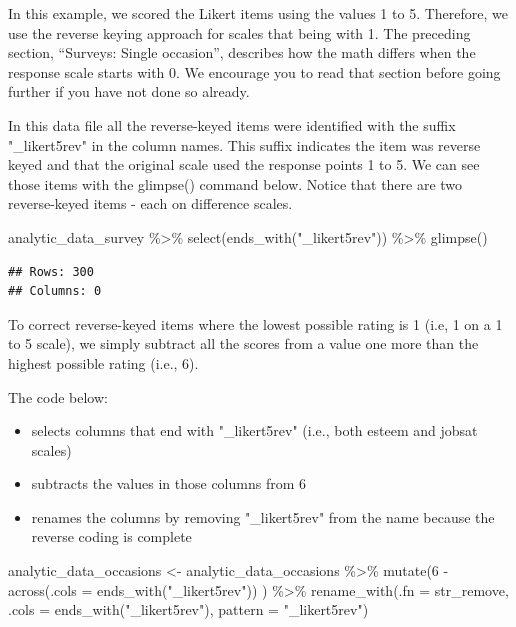 \documentclass[
]{krantz}
\makeatletter
\newenvironment{Shaded}{\begin{snugshade}}{\end{snugshade}}
\newcommand{\AttributeTok}[1]{\textcolor[rgb]{0.61,0.61,0.61}{#1}}
\newcommand{\DecValTok}[1]{\textcolor[rgb]{0.06,0.06,0.06}{#1}}
\newcommand{\FunctionTok}[1]{\textcolor[rgb]{0,0,0}{#1}}
\newcommand{\NormalTok}[1]{#1}
\newcommand{\OtherTok}[1]{\textcolor[rgb]{0.37,0.37,0.37}{#1}}
\newcommand{\SpecialCharTok}[1]{\textcolor[rgb]{0,0,0}{#1}}
\newcommand{\StringTok}[1]{\textcolor[rgb]{0.5,0.5,0.5}{#1}}
\providecommand{\tightlist}{%
  \setlength{\itemsep}{0pt}\setlength{\parskip}{0pt}}
\newenvironment{kframe}{%
\medskip{}
\setlength{\fboxsep}{.8em}
 \def\at@end@of@kframe{}%
 \ifinner\ifhmode%
  \def\at@end@of@kframe{\end{minipage}}%
  \begin{minipage}{\columnwidth}%
 \fi\fi%
 \def\FrameCommand##1{\hskip\@totalleftmargin \hskip-\fboxsep
 \colorbox{shadecolor}{##1}\hskip-\fboxsep
     \hskip-\linewidth \hskip-\@totalleftmargin \hskip\columnwidth}%
 \MakeFramed {\advance\hsize-\width
   \@totalleftmargin\z@ \linewidth\hsize
   \@setminipage}}%
 {\par\unskip\endMakeFramed%
 \at@end@of@kframe}
\renewenvironment{Shaded}{\begin{kframe}}{\end{kframe}}
\makeatother
\begin{document}
In this example, we scored the Likert items using the values 1 to 5. Therefore, we use the reverse keying approach for scales that being with 1. The preceding section, ``Surveys: Single occasion'', describes how the math differs when the response scale starts with 0. We encourage you to read that section before going further if you have not done so already.

In this data file all the reverse-keyed items were identified with the suffix "\_likert5rev" in the column names. This suffix indicates the item was reverse keyed and that the original scale used the response points 1 to 5. We can see those items with the glimpse() command below. Notice that there are two reverse-keyed items - each on difference scales.

\begin{Shaded}
\begin{Highlighting}[]
\NormalTok{analytic\_data\_survey }\SpecialCharTok{\%\textgreater{}\%}
  \FunctionTok{select}\NormalTok{(}\FunctionTok{ends\_with}\NormalTok{(}\StringTok{"\_likert5rev"}\NormalTok{)) }\SpecialCharTok{\%\textgreater{}\%}
  \FunctionTok{glimpse}\NormalTok{()}
\end{Highlighting}
\end{Shaded}

\begin{verbatim}
## Rows: 300
## Columns: 0
\end{verbatim}

To correct reverse-keyed items where the lowest possible rating is 1 (i.e, 1 on a 1 to 5 scale), we simply subtract all the scores from a value one more than the highest possible rating (i.e., 6).

The code below:

\begin{itemize}
\tightlist
\item
  selects columns that end with "\_likert5rev" (i.e., both esteem and jobsat scales)
\item
  subtracts the values in those columns from 6
\item
  renames the columns by removing "\_likert5rev" from the name because the reverse coding is complete
\end{itemize}

\begin{Shaded}
\begin{Highlighting}[]
\NormalTok{analytic\_data\_occasions }\OtherTok{\textless{}{-}}\NormalTok{ analytic\_data\_occasions }\SpecialCharTok{\%\textgreater{}\%} 
  \FunctionTok{mutate}\NormalTok{(}\DecValTok{6} \SpecialCharTok{{-}} \FunctionTok{across}\NormalTok{(}\AttributeTok{.cols =} \FunctionTok{ends\_with}\NormalTok{(}\StringTok{"\_likert5rev"}\NormalTok{)) ) }\SpecialCharTok{\%\textgreater{}\%} 
  \FunctionTok{rename\_with}\NormalTok{(}\AttributeTok{.fn =}\NormalTok{ str\_remove,}
              \AttributeTok{.cols =} \FunctionTok{ends\_with}\NormalTok{(}\StringTok{"\_likert5rev"}\NormalTok{),}
              \AttributeTok{pattern =} \StringTok{"\_likert5rev"}\NormalTok{)}
\end{Highlighting}
\end{Shaded}
\end{document}
